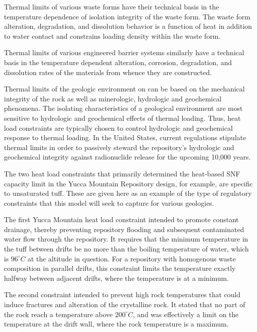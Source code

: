 Thermal limits of various waste forms have their technical basis in the 
temperature dependence of isolation integrity of the waste form.  The waste form 
alteration, degradation, and dissolution behavior is a function of heat in 
addition to water contact and constrains loading density within the waste form. 
 
Thermal limits of various engineered barrier systems similarly have a technical 
basis in the temperature dependent alteration, corrosion, degradation, and 
dissolution rates of the materials from whence they are constructed.  

Thermal limits of the geologic environment on can be based on the mechanical 
integrity of the rock as well as minerologic, hydrologic and geochemical 
phenomena. The isolating characteristics of a geological environment are most 
sensitive to hydrologic 
and geochemical effects of thermal loading. Thus, heat load constraints are 
typically chosen to control hydrologic and geochemical response to thermal 
loading. In the United States, current regulations stipulate thermal limits in 
order to passively steward the repository's hydrologic and geochemical integrity 
against radionuclide  release for the upcoming 10,000 years.

The two heat load constraints that primarily determined the heat-based SNF 
capacity limit in the Yucca Mountain Repository design, for example, are 
specific to unsaturated tuff. These are given here as an example of the type of 
regulatory constraints that this model will seek to capture for various 
geologies. 

The first Yucca Mountain heat load constraint intended to promote constant 
drainage, thereby preventing repository flooding and subsequent contaminated 
water flow through the repository. It requires that the minimum temperature in 
the tuff between drifts be no  more than the boiling temperature of water, which 
is $96^{\circ}C$ at the altitude in question. For a repository with homogenous 
waste composition in parallel drifts, this constraint limits the temperature 
exactly halfway between adjacent drifts, where the temperature is at a minimum.

The second constraint intended to prevent high rock temperatures that could 
induce fractures and alteration of the crystalline rock. It stated that no part 
of the rock reach a temperature above $200^{\circ}C$, and was effectively a 
limit on the temperature at the drift wall, where the rock temperature is a 
maximum.  

